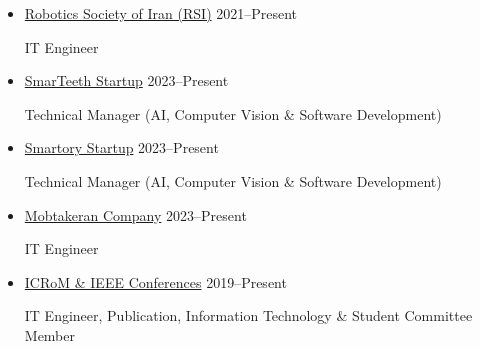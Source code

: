 \documentclass[11pt,a4paper,sans]{moderncv} %
\begin{document}
\begin{itemize}
    
    			
      \vspace{1em}
		\item \href{https://rsiran.ir/en/}{ Robotics Society of Iran (RSI)} \hfill 2021--Present
		
        IT Engineer

        
        \vspace{1em}
		\item \href{https://smarteeth.ai/}{ SmarTeeth Startup} \hfill 2023--Present
		
        Technical Manager (AI, Computer Vision \& Software Development)

        \vspace{1em}
		\item \href{https://smartory.co/}{ Smartory Startup} \hfill 2023--Present
		
        Technical Manager (AI, Computer Vision \& Software Development)

                \vspace{1em}
		\item \href{https://mpa-co.com/}{ Mobtakeran Company} \hfill 2023--Present
		
        IT Engineer

           \vspace{1em}
		\item \href{https://icrom.ir/}{ ICRoM \& IEEE Conferences} \hfill 2019--Present
		
        IT Engineer, Publication, Information Technology \& Student Committee Member
        

\end{itemize}
\end{document}
